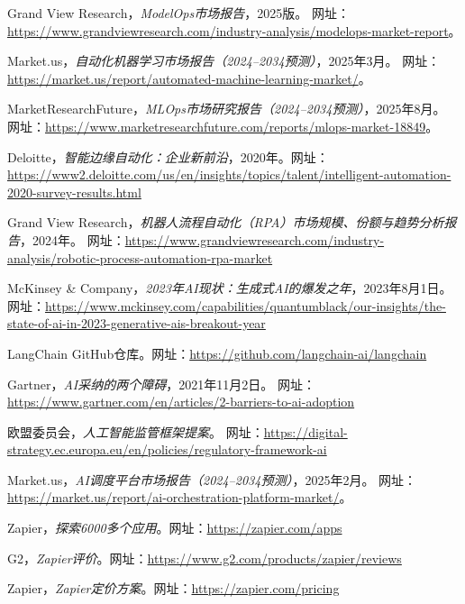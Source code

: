 \documentclass[11点, A4纸, 单面]{article}
\begin{document}
\begin{thebibliography}{99}
    Grand View Research，\textit{ModelOps市场报告}，2025版。
    网址：\url{https://www.grandviewresearch.com/industry-analysis/modelops-market-report}。

    Market.us，\textit{自动化机器学习市场报告（2024--2034预测）}，2025年3月。
    网址：\url{https://market.us/report/automated-machine-learning-market/}。

    MarketResearchFuture，\textit{MLOps市场研究报告（2024--2034预测）}，2025年8月。
    网址：\url{https://www.marketresearchfuture.com/reports/mlops-market-18849}。

    Deloitte，\textit{智能边缘自动化：企业新前沿}，2020年。网址：\url{https://www2.deloitte.com/us/en/insights/topics/talent/intelligent-automation-2020-survey-results.html}

    Grand View Research，\textit{机器人流程自动化（RPA）市场规模、份额与趋势分析报告}，2024年。
    网址：\url{https://www.grandviewresearch.com/industry-analysis/robotic-process-automation-rpa-market}

    McKinsey \& Company，\textit{2023年AI现状：生成式AI的爆发之年}，2023年8月1日。
    网址：\url{https://www.mckinsey.com/capabilities/quantumblack/our-insights/the-state-of-ai-in-2023-generative-ais-breakout-year}

    LangChain GitHub仓库。网址：\url{https://github.com/langchain-ai/langchain}

    Gartner，\textit{AI采纳的两个障碍}，2021年11月2日。
    网址：\url{https://www.gartner.com/en/articles/2-barriers-to-ai-adoption}

    欧盟委员会，\textit{人工智能监管框架提案}。
    网址：\url{https://digital-strategy.ec.europa.eu/en/policies/regulatory-framework-ai}

    Market.us，\textit{AI调度平台市场报告（2024--2034预测）}，2025年2月。
    网址：\url{https://market.us/report/ai-orchestration-platform-market/}。

    Zapier，\textit{探索6000多个应用}。网址：\url{https://zapier.com/apps}

    G2，\textit{Zapier评价}。网址：\url{https://www.g2.com/products/zapier/reviews}

    Zapier，\textit{Zapier定价方案}。网址：\url{https://zapier.com/pricing}


\end{thebibliography}
\end{document}
